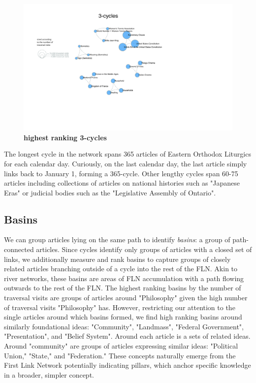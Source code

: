 \documentclass[pre,twocolumn,twoside,superscriptaddress,floatfix, aps, 10pt]{revtex4-1}
\begin{document}
\begin{figure}[tp!]
  \centering	
  \includegraphics[width=\textwidth]{graphics/3_cycles.pdf}
  \caption{
    \textbf{highest ranking 3-cycles}
  }
  \label{fig:3-cycles}
\end{figure}

The longest cycle in the network spans 365 articles of Eastern Orthodox Liturgics for each calendar day. 
Curiously, on the last calendar day, the last article simply links back to January 1, forming a 365-cycle.
Other lengthy cycles span 60-75 articles including collections of articles on national histories such as "Japanese Eras" 
or judicial bodies such as the "Legislative Assembly of Ontario".


\subsection{Basins}

We can group articles lying on the same path to identify {\it basins}: 
a group of path-connected articles.
Since cycles identify only groups of articles with a closed set of links, 
we additionally measure and rank basins to capture groups of closely related
articles branching outside of a cycle into the rest of the FLN.
Akin to river networks, these basins are areas of FLN accumulation with a path 
flowing outwards to the rest of the FLN.
The highest ranking basins by the number of traversal visits are groups of articles
around "Philosophy" given the high number of traversal visits "Philosophy" has. 
However, restricting our attention to the 
 single articles around which basins formed,
 we find high ranking basins around similarly foundational ideas:
"Community", "Landmass", "Federal Government", "Presentation", and "Belief System". 
Around each article is a sets of related ideas. Around "community" are groups of articles expressing similar ideas: "Political Union," "State," and "Federation." 
These concepts naturally emerge from the First Link Network potentially indicating pillars, which 
anchor specific knowledge in a broader, simpler concept.
\end{document}
